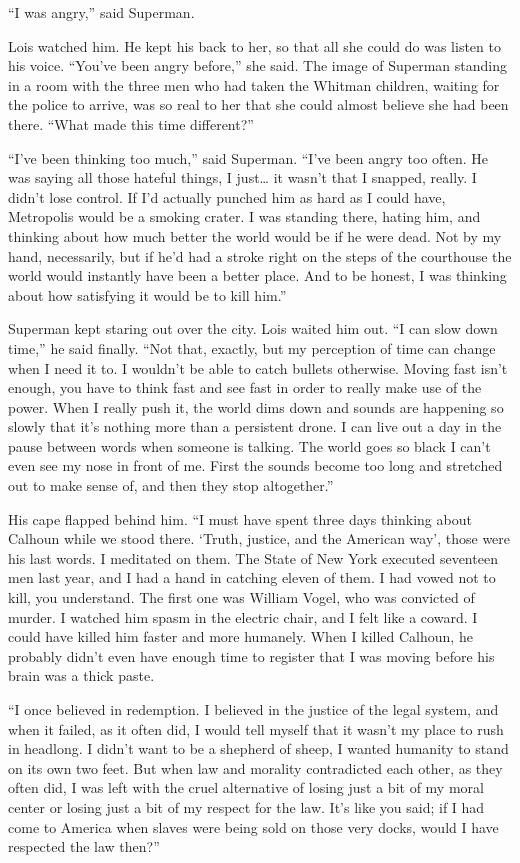 \documentclass[ebook,12pt]{memoir}
\begin{document}
``I was angry,'' said Superman.

Lois watched him. He kept his back to her, so that all she could do was
listen to his voice. ``You've been angry before,'' she said. The image
of Superman standing in a room with the three men who had taken the
Whitman children, waiting for the police to arrive, was so real to her
that she could almost believe she had been there. ``What made this time
different?''

``I've been thinking too much,'' said Superman. ``I've been angry too
often. He was saying all those hateful things, I just\ldots{} it wasn't
that I snapped, really. I didn't lose control. If I'd actually punched
him as hard as I could have, Metropolis would be a smoking crater. I was
standing there, hating him, and thinking about how much better the world
would be if he were dead. Not by my hand, necessarily, but if he'd had a
stroke right on the steps of the courthouse the world would instantly
have been a better place. And to be honest, I was thinking about how
satisfying it would be to kill him.''

Superman kept staring out over the city. Lois waited him out. ``I can
slow down time,'' he said finally. ``Not that, exactly, but my
perception of time can change when I need it to. I wouldn't be able to
catch bullets otherwise. Moving fast isn't enough, you have to think
fast and see fast in order to really make use of the power. When I
really push it, the world dims down and sounds are happening so slowly
that it's nothing more than a persistent drone. I can live out a day in
the pause between words when someone is talking. The world goes so black
I can't even see my nose in front of me. First the sounds become too
long and stretched out to make sense of, and then they stop
altogether.''

His cape flapped behind him. ``I must have spent three days thinking
about Calhoun while we stood there. `Truth, justice, and the American
way', those were his last words. I meditated on them. The State of New
York executed seventeen men last year, and I had a hand in catching
eleven of them. I had vowed not to kill, you understand. The first one
was William Vogel, who was convicted of murder. I watched him spasm in
the electric chair, and I felt like a coward. I could have killed him
faster and more humanely. When I killed Calhoun, he probably didn't even
have enough time to register that I was moving before his brain was a
thick paste.

``I once believed in redemption. I believed in the justice of the legal
system, and when it failed, as it often did, I would tell myself that it
wasn't my place to rush in headlong. I didn't want to be a shepherd of
sheep, I wanted humanity to stand on its own two feet. But when law and
morality contradicted each other, as they often did, I was left with the
cruel alternative of losing just a bit of my moral center or losing just
a bit of my respect for the law. It's like you said; if I had come to
America when slaves were being sold on those very docks, would I have
respected the law then?''
\end{document}
